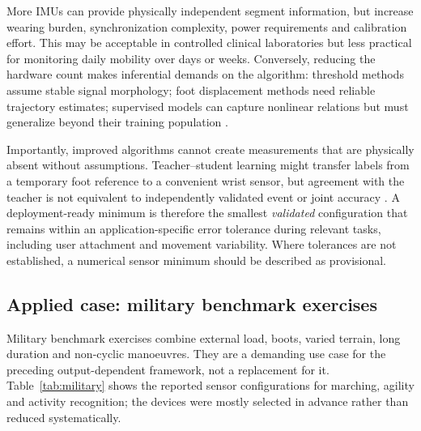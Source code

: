 \documentclass[10pt,a4paper,twocolumn]{article}
\begin{document}
More IMUs can provide physically independent segment information, but increase wearing burden, synchronization complexity, power requirements and calibration effort. This may be acceptable in controlled clinical laboratories but less practical for monitoring daily mobility over days or weeks. Conversely, reducing the hardware count makes inferential demands on the algorithm: threshold methods assume stable signal morphology; foot displacement methods need reliable trajectory estimates; supervised models can capture nonlinear relations but must generalize beyond their training population \citep{wagstaff2020,ruizruiz2024,romijnders2022}.

Importantly, improved algorithms cannot create measurements that are physically absent without assumptions. Teacher--student learning might transfer labels from a temporary foot reference to a convenient wrist sensor, but agreement with the teacher is not equivalent to independently validated event or joint accuracy \citep{koroglu2018,kolakowski2024}. A deployment-ready minimum is therefore the smallest \emph{validated} configuration that remains within an application-specific error tolerance during relevant tasks, including user attachment and movement variability. Where tolerances are not established, a numerical sensor minimum should be described as provisional.

\subsection{Applied case: military benchmark exercises}
\label{sec:disc-military}

Military benchmark exercises combine external load, boots, varied terrain, long duration and non-cyclic manoeuvres. They are a demanding use case for the preceding output-dependent framework, not a replacement for it. Table~\ref{tab:military} shows the reported sensor configurations for marching, agility and activity recognition; the devices were mostly selected in advance rather than reduced systematically.
\end{document}
